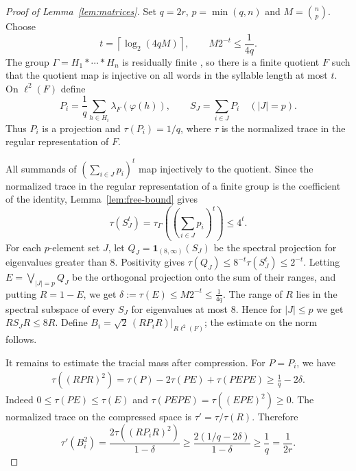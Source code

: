 \documentclass[a4paper,11pt]{amsproc}
\numberwithin{equation}{section}
\theoremstyle{definition}
\newcommand{\one}{\mathbf 1}
\begin{document}
\begin{proof}[Proof of Lemma~\ref{lem:matrices}]
Set $q=2r$, $p=\min(q,n)$ and $M=\binom np$. Choose
\begin{equation}\label{eq:moment-order}
 t=\left\lceil\log_2(4qM)\right\rceil,
 \qquad M2^{-t}\le\frac1{4q}.
\end{equation}
The group $\Gamma=H_1*\cdots*H_n$ is residually finite \cite[Theorem 4.1, Corollary (ii)]{gruenberg}, so there is a finite quotient $F$ such that the quotient map is injective on all words in the syllable length at most $t$. On $\ell^2(F)$ define
\begin{equation}\label{eq:finite-projections}
 P_i=\frac1q\sum_{h\in H_i}\lambda_F(\varphi(h)),
 \qquad S_J=\sum_{i\in J}P_i\quad(|J|=p).
\end{equation}
Thus $P_i$ is a projection and $\tau(P_i)=1/q$, where $\tau$ is the normalized trace in the regular representation of $F$.

All summands of $(\sum_{i\in J}p_i)^t$ map injectively to the quotient. Since the normalized trace in the regular representation of a finite group is the coefficient of the identity, Lemma~\ref{lem:free-bound} gives
\begin{equation}\label{eq:finite-moments}
 \tau(S_J^t)
 =\tau_\Gamma\left(\left(\sum_{i\in J}p_i\right)^t\right)
 \le4^t.
\end{equation}
For each $p$-element set $J$, let $Q_J=\one_{(8,\infty)}(S_J)$ be the spectral projection for eigenvalues greater than 8. Positivity gives
\( \tau(Q_J)\le8^{-t}\tau(S_J^t)\le2^{-t}\). Letting $E=\bigvee_{|J|=p}Q_J$ be the orthogonal projection onto the sum of their ranges, and putting $R=1-E$, we get \(\delta:=\tau(E)\le M2^{-t}\le\frac1{4q}\). The range of $R$ lies in the spectral subspace of every $S_J$ for eigenvalues at most 8. Hence for $|J|\le p$ we get \(R S_JR\le8R\). Define \(B_i=\sqrt2\,(RP_iR)|_{R\ell^2(F)}\); the estimate on the norm follows.

It remains to estimate the tracial mass after compression. For $P=P_i$, we have
\begin{align}
 \tau((RPR)^2)
 =\tau(P)-2\tau(PE)+\tau(PEPE)
 \ge\frac1q-2\delta.\label{eq:mass-after-compression}
\end{align}
Indeed $0\le\tau(PE)\le\tau(E)$ and
$\tau(PEPE)=\tau((EPE)^2)\ge0$. The normalized trace on the compressed space is $\tau'=\tau/\tau(R)$. Therefore
\begin{equation}\label{eq:normalized-mass}
 \tau'(B_i^2)
 =\frac{2\tau((RP_iR)^2)}{1-\delta}
 \ge\frac{2(1/q-2\delta)}{1-\delta}
 \ge\frac1q=\frac1{2r}.
\end{equation}
\end{proof}
\end{document}

